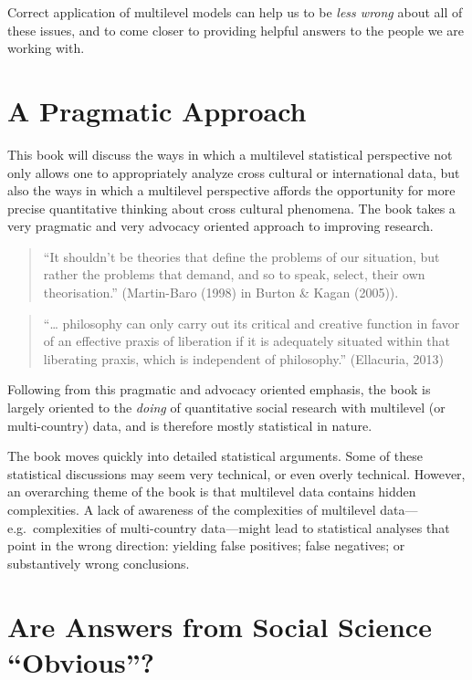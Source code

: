 \documentclass[
  letterpaper,
  DIV=11,
  numbers=noendperiod]{scrreprt}
\begin{document}
Correct application of multilevel models can help us to be \emph{less
wrong} about all of these issues, and to come closer to providing
helpful answers to the people we are working with. 

\section{A Pragmatic Approach}\label{a-pragmatic-approach}

This book will discuss the ways in which a multilevel statistical
perspective not only allows one to appropriately analyze cross cultural
or international data, but also the ways in which a multilevel
perspective affords the opportunity for more precise quantitative
thinking about cross cultural phenomena. The book takes a very pragmatic
and very advocacy oriented approach to improving research.
 

\begin{quote}
``It shouldn't be theories that define the problems of our situation,
but rather the problems that demand, and so to speak, select, their own
theorisation.'' (Martin-Baro (1998) in Burton \& Kagan (2005)).
\end{quote}

\begin{quote}
``\ldots{} philosophy can only carry out its critical and creative
function in favor of an effective praxis of liberation if it is
adequately situated within that liberating praxis, which is independent
of philosophy.'' (Ellacuria, 2013)
\end{quote}

Following from this pragmatic and advocacy oriented emphasis, the book
is largely oriented to the \emph{doing} of quantitative social research
with multilevel (or multi-country) data, and is therefore mostly
statistical in nature.

The book moves quickly into detailed statistical arguments. Some of
these statistical discussions may seem very technical, or even overly
technical. However, an overarching theme of the book is that multilevel
data contains hidden complexities. A lack of awareness of the
complexities of multilevel data---e.g.~complexities of multi-country
data---might lead to statistical analyses that point in the wrong
direction: yielding false positives; false negatives; or substantively
wrong conclusions.

\section{Are Answers from Social Science
``Obvious''?}\label{sec-obvious}
\end{document}

